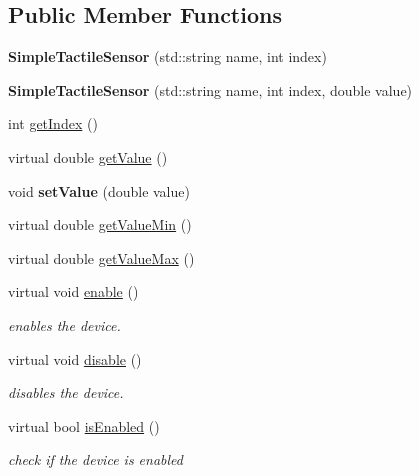 \subsection*{Public Member Functions}
\begin{DoxyCompactItemize}
\item 
\hypertarget{classdrobot_1_1device_1_1tactile_1_1SimpleTactileSensor_acd670a819320a63177f9eb6f88691fc7}{{\bfseries Simple\-Tactile\-Sensor} (std\-::string name, int index)}\label{classdrobot_1_1device_1_1tactile_1_1SimpleTactileSensor_acd670a819320a63177f9eb6f88691fc7}

\item 
\hypertarget{classdrobot_1_1device_1_1tactile_1_1SimpleTactileSensor_a2e5d7cc36402602496016a302e8da363}{{\bfseries Simple\-Tactile\-Sensor} (std\-::string name, int index, double value)}\label{classdrobot_1_1device_1_1tactile_1_1SimpleTactileSensor_a2e5d7cc36402602496016a302e8da363}

\item 
int \hyperlink{classdrobot_1_1device_1_1tactile_1_1SimpleTactileSensor_a63ae2c9a6ec73bf35d23f6012365aecb}{get\-Index} ()
\item 
virtual double \hyperlink{classdrobot_1_1device_1_1tactile_1_1SimpleTactileSensor_a8f9d1aec99cd3c53bac343af3a3bda60}{get\-Value} ()
\item 
\hypertarget{classdrobot_1_1device_1_1tactile_1_1SimpleTactileSensor_a6c09c4748dfbacf9b62b1e2f811827c0}{void {\bfseries set\-Value} (double value)}\label{classdrobot_1_1device_1_1tactile_1_1SimpleTactileSensor_a6c09c4748dfbacf9b62b1e2f811827c0}

\item 
virtual double \hyperlink{classdrobot_1_1device_1_1tactile_1_1SimpleTactileSensor_aff61edb7f9ccdac4f0209590bb8d7d76}{get\-Value\-Min} ()
\item 
virtual double \hyperlink{classdrobot_1_1device_1_1tactile_1_1SimpleTactileSensor_aa5e6c1634c8fafe61e41cb998c02b6b6}{get\-Value\-Max} ()
\item 
virtual void \hyperlink{classdrobot_1_1device_1_1tactile_1_1SimpleTactileSensor_a006318b86b569b7f72605d24f1948042}{enable} ()
\begin{DoxyCompactList}\small\item\em enables the device. \end{DoxyCompactList}\item 
virtual void \hyperlink{classdrobot_1_1device_1_1tactile_1_1SimpleTactileSensor_a0599c06afdb09494de0e6756a878cbad}{disable} ()
\begin{DoxyCompactList}\small\item\em disables the device. \end{DoxyCompactList}\item 
virtual bool \hyperlink{classdrobot_1_1device_1_1tactile_1_1SimpleTactileSensor_a54b5ab7b69bb3b15727ef72143799f34}{is\-Enabled} ()
\begin{DoxyCompactList}\small\item\em check if the device is enabled \end{DoxyCompactList}\end{DoxyCompactItemize}
